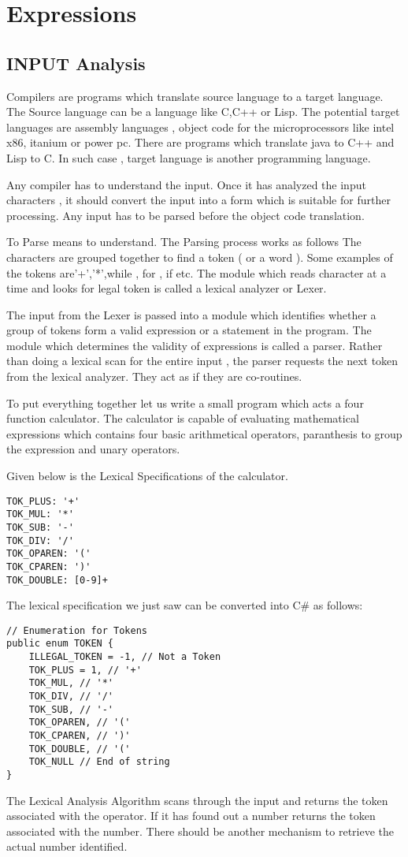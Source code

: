 \chapter{Expressions}
\section{INPUT Analysis}
Compilers are programs which translate source language to a target language. The Source language can be a language like C,C++ or Lisp. The potential target languages are assembly languages , object code
for the microprocessors like intel x86, itanium or power pc. There are programs which translate java to C++ and Lisp to C. In such case , target language is another programming language. 

Any compiler has to understand the input. Once it has analyzed the input characters , it should convert the input into a form which is suitable for further processing. Any input has to be parsed before the object code translation. 

To Parse means to understand. The Parsing process works as follows
The characters are grouped together to find a token ( or a word ). Some examples of the tokens are'+','*',while , for , if etc. The module which reads character at a time and looks for legal token is called
a lexical analyzer or Lexer. 

The input from the Lexer is passed into a module which identifies whether a group of tokens form a valid expression or a statement in the program. The module which determines the validity of expressions is called a parser. Rather than doing a lexical scan for the entire input , the parser requests the next token from the lexical analyzer. They act as if they are co-routines.

To put everything together let us write a small program which acts a four function calculator. The calculator is capable of evaluating mathematical expressions which contains four basic arithmetical operators, paranthesis to group the expression and unary operators.

Given below is the Lexical Specifications of the calculator.
\lstset{style=csharp}
\begin{lstlisting}
TOK_PLUS: '+'
TOK_MUL: '*'
TOK_SUB: '-'
TOK_DIV: '/'
TOK_OPAREN: '('
TOK_CPAREN: ')'
TOK_DOUBLE: [0-9]+
\end{lstlisting}


The lexical specification we just saw can be converted into C\# as follows:
\lstset{style=csharp}
\begin{lstlisting}
// Enumeration for Tokens
public enum TOKEN {
	ILLEGAL_TOKEN = -1, // Not a Token
	TOK_PLUS = 1, // '+'
	TOK_MUL, // '*'
	TOK_DIV, // '/'
	TOK_SUB, // '-'
	TOK_OPAREN, // '('
	TOK_CPAREN, // ')'
	TOK_DOUBLE, // '('
	TOK_NULL // End of string
}
\end{lstlisting}
\clearpage
The Lexical Analysis Algorithm scans through the input and returns the token associated with the operator. If it has found out a number returns the token associated with the number. There should be another mechanism to retrieve the actual number identified.

